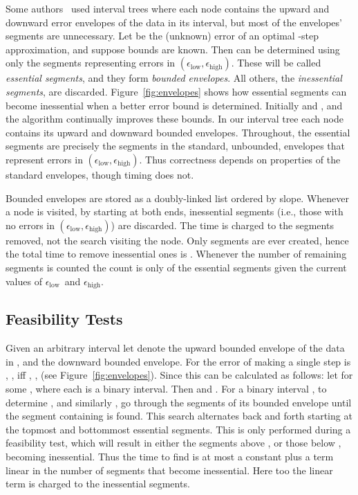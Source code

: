 \documentclass[11pt]{article}
\newcommand{\epslow}{\ensuremath{\epsilon_\mathrm{low}}}
\newcommand{\epshigh}{\ensuremath{\epsilon_\mathrm{high}}}
\newcommand{\epsinterval}[1]{\ensuremath{(\epslow,\epshigh#1}}
\begin{document}
Some authors~\cite{ChenWangPiecewise2013,FournierVigneronLinftyStep,GuhaShimLinftyHistogram} used interval trees where each node 
contains the upward and downward error envelopes of the data in its interval, but most of the envelopes' segments are unnecessary.
Let  be the (unknown) error of an optimal -step approximation,
and suppose bounds  are known.
Then  can be determined using only the segments representing errors in \epsinterval{)}.
These will be called \textit{essential segments}, and they form \textit{bounded envelopes}.
All others, the \textit{inessential segments}, are discarded.
Figure~\ref{fig:envelopes} shows how essential segments can become inessential when a better error bound is determined.
Initially  and , and the algorithm continually improves these bounds.
In our interval tree each node contains its upward and downward bounded envelopes.
Throughout, the essential segments are precisely the segments in the standard, unbounded, envelopes that represent errors in \epsinterval{)}.
Thus correctness depends on properties of the standard envelopes, though timing does not.

Bounded envelopes are stored as a doubly-linked list ordered by slope.
Whenever a node is visited, by starting at both ends, inessential segments (i.e., those with no errors in \epsinterval{)}) are discarded.
The time is charged to the segments removed, not the search visiting the node.
Only  segments are ever created, hence the total time to remove inessential ones is .
Whenever the number of remaining segments is counted the count is only of the essential segments given the current values of \epslow\ and \epshigh.



\subsection{Feasibility Tests} \label{sec:feasibility}


Given an arbitrary interval let  denote the upward bounded envelope of the data in , and  the downward bounded envelope. 
For  the error of making  a single step is , ,   iff  , ,  
(see Figure~\ref{fig:envelopes}).
Since  this can be calculated as follows:
let  for some , where each  is a binary interval.
Then  and .
For a binary interval , to determine , and similarly , go through the segments of its bounded envelope until the segment  containing  is found.
This search
alternates back and forth starting at the topmost and bottommost essential segments.
This is only performed during a feasibility test, which will result in either the segments above , or those below , becoming inessential.
Thus the time to find  is at most a constant plus a term linear in the number of segments that become inessential.
Here too the linear term is charged to the inessential segments.
\end{document}
